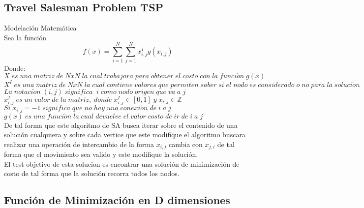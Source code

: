 \documentclass[10pt]{article}
\begin{document}
\subsection{Travel Salesman Problem TSP}
Modelación Matemática\\
Sea la función
\[f(x)=\sum_{i=1}^{N}\sum_{j=1}^{N}x^{I}_{i,j}g(x_{i,j})\]
Donde:\\
\(\displaystyle X\;es\;una\;matriz\;de\;NxN\;la\;cual\;trabajara\;para\;obtener\;el\;costo\;con\;la\;funci\acute{o}n\;g(x)\)\\\vspace{0.25cm}
\(\displaystyle X^{I}\;es\;una\;matriz\;de\;NxN\;la\;cual\;contiene\;valores\;que\;permiten\;saber\;si\;el\;nodo\;es\;considerado\;o\;no\;para\;la\;soluci\acute{o}n\;\)\\\vspace{0.25cm}
\(\displaystyle La\;notaci\acute{o}n\;(i,j)\;significa\;\;i\;como\;nodo\;origen\;que\;va\;a\;j\)\\\vspace{0.25cm}
\(\displaystyle x^{I}_{i,j}\;es\;un\;valor\;de\;la\;matriz,\;donde\;x^{I}_{i,j}\in[0,1]\;y\;x_{i,j}\in\mathbb{Z}\)\\\vspace{0.25cm}
\(\displaystyle Si\;x_{i,j}=-1\;significa\;que\;no\;hay\;una\;conexi\acute{o}n\;de\;i\;a\;j\)\\\vspace{0.25cm}
\(\displaystyle g(x)\;es\;una\;funci\acute{o}n\;la\;cual\;devuelve\;el\;valor\;costo\;de\;ir\;de\;i\;a\;j\)\\\vspace{0.25cm}
De tal forma que este algoritmo de SA busca iterar sobre el contenido de una solución cualquiera y sobre cada vertice que este modifique el algoritmo buscara realizar una operación de intercambio de la forma $x_{i,j}$ cambia con $x_{j,i}$ de tal forma que el movimiento sea valido y este modifique la solución.\\
El test objetivo de esta solucion es encontrar una solución de minimización de costo de tal forma que la solución recorra todos los nodos.
\subsection{Función de Minimización en D dimensiones}
\end{document}
